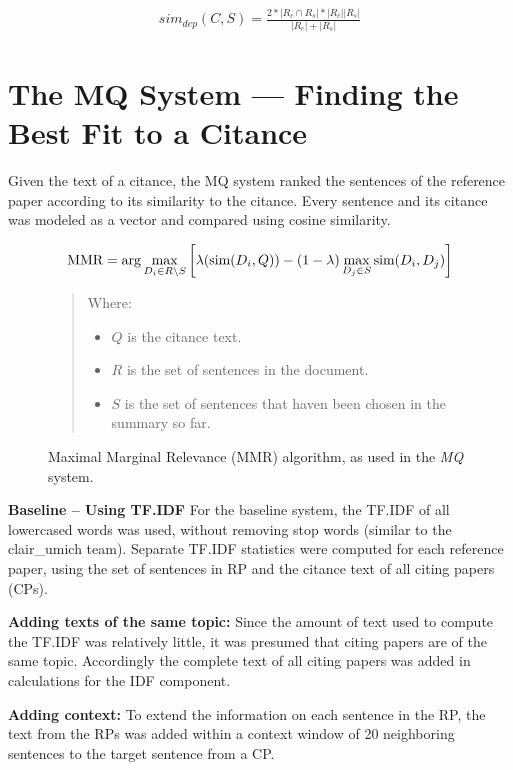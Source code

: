 \documentclass[11pt]{article}
\begin{document}
\begin{enumerate}
\vspace{-.3cm}
\begin{eqnarray*}
  sim_{dep}(C,S) = \frac{2*|R_c \cap R_s| * |R_c||R_s|}{|R_c|+|R_s|}
\end{eqnarray*}
\end{enumerate}
 

\section{The MQ System --- Finding the Best Fit to a Citance}
\label{s:mq}
Given the text of a citance, the MQ system ranked the sentences of the reference paper 
according to its similarity to the citance. Every sentence and its citance was modeled 
as a vector and compared using cosine similarity. 

\begin{figure*}
$$
\hbox{MMR} = \arg\max_{D_i\in R\setminus S}\left[\lambda(\hbox{sim}(D_i,Q)) -
(1-\lambda) \max_{D_j\in S} \hbox{sim}(D_i,D_j)\right]
$$  
\begin{quote}
Where:
\begin{itemize}
\item $Q$ is the citance text.
\item $R$ is the set of sentences in the document.
\item $S$ is the set of sentences that haven been chosen in the
  summary so far.  
\end{itemize}
\end{quote}
  \caption{Maximal Marginal Relevance (MMR) algorithm, as used in the {\it MQ} system.}
  \label{fig:mmr}
\end{figure*}

\textbf{Baseline -- Using TF.IDF}
For the baseline system, the TF.IDF of all lowercased words was used, 
without removing stop words (similar to the clair\_umich team). 
Separate TF.IDF statistics were computed for each reference paper, 
using the set of sentences in RP and the citance text of all 
citing papers (CPs).

\textbf{Adding texts of the same topic:}
Since the amount of text used to compute the TF.IDF was relatively little, 
it was presumed that citing papers are of the same topic. Accordingly the 
complete text of all citing papers was added in calculations for the IDF 
component.

\textbf{Adding context:}
To extend the information on each sentence in the RP,
the text from the RPs was added within a context window of 
20 neighboring sentences to the target sentence from a CP. 
\end{document}
